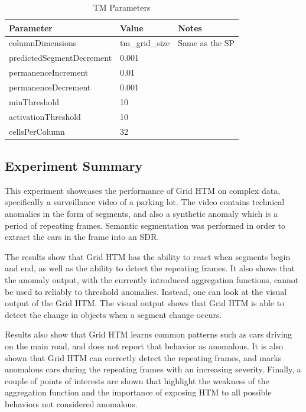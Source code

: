 \begin{table}[H]
    \centering
    \begin{tabularx}{\linewidth}{@{}XlX@{}}
        \toprule
        \textbf{Parameter}        & \textbf{Value} & \textbf{Notes} \\
        \midrule
        columnDimensions          & tm\_grid\_size & Same as the SP \\
        predictedSegmentDecrement & 0.001          &                \\
        permanenceIncrement       & 0.01           &                \\
        permanenceDecrement       & 0.001          &                \\
        minThreshold              & 10             &                \\
        activationThreshold       & 10             &                \\
        cellsPerColumn            & 32             &                \\
        \bottomrule
    \end{tabularx}
    \caption{TM Parameters}
    \label{tab:surveillance_tm}
\end{table}
\subsection{Experiment Summary}
This experiment showcases the performance of Grid HTM on complex data, specifically a surveillance video of a parking lot. The video contains technical anomalies in the form of segments, and also a synthetic anomaly which is a period of repeating frames. Semantic segmentation was performed in order to extract the cars in the frame into an SDR.
\par
The results show that Grid HTM has the ability to react when segments begin and end, as well as the ability to detect the repeating frames. It also shows that the anomaly output, with the currently introduced aggregation functions, cannot be used to reliably to threshold anomalies. Instead, one can look at the visual output of the Grid HTM. The visual output shows that Grid HTM is able to detect the change in objects when a segment change occurs.
\par
Results also show that Grid HTM learns common patterns such as cars driving on the main road, and does not report that behavior as anomalous. It is also shown that Grid HTM can correctly detect the repeating frames, and marks anomalous cars during the repeating frames with an increasing severity. Finally, a couple of points of interests are shown that highlight the weakness of the aggregation function and the importance of exposing HTM to all possible behaviors not considered anomalous.
\clearpage
